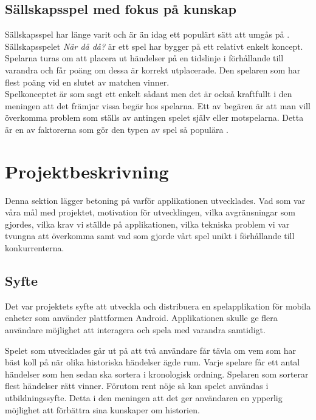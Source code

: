 \documentclass[a4paper, 11pt]{article}
\begin{document}
\subsection{Sällskapsspel med fokus på kunskap}
Sällskapsspel har länge varit och är än idag ett populärt sätt att umgås på \cite{bradspelspop}. Sällskapsspelet \textit{När då då?} \cite{nardada} är ett spel har bygger på ett relativt enkelt koncept. Spelarna turas om att placera ut händelser på en tidslinje i förhållande till varandra och får poäng om dessa är korrekt utplacerade. Den spelaren som har flest poäng vid en slutet av matchen vinner. \\
Spelkonceptet är som sagt ett enkelt sådant men det är också kraftfullt i den meningen att det främjar vissa begär hos spelarna. Ett av begären är att man vill överkomma problem som ställs av antingen spelet själv eller motspelarna. Detta är en av faktorerna som gör den typen av spel så populära \cite{psykologi}.

\section{Projektbeskrivning}
Denna sektion lägger betoning på varför applikationen utvecklades. Vad som var våra mål med projektet, motivation för utvecklingen, vilka avgränsningar som gjordes, vilka krav vi ställde på applikationen, vilka tekniska problem vi var tvungna att överkomma samt vad som gjorde vårt spel unikt i förhållande till konkurrenterna.

\subsection{Syfte}
Det var projektets syfte att utveckla och distribuera en spelapplikation för mobila enheter som använder plattformen Android. Applikationen skulle ge flera användare möjlighet att interagera och spela med varandra samtidigt.

Spelet som utvecklades går ut på att två användare får tävla om vem som har bäst koll på när olika historiska händelser ägde rum. Varje spelare får ett antal händelser som hen sedan ska sortera i kronologisk ordning. Spelaren som sorterar flest händelser rätt vinner. Förutom rent nöje så kan spelet användas i utbildningssyfte. Detta i den meningen att det ger användaren en ypperlig möjlighet att förbättra sina kunskaper om historien.
\end{document}
